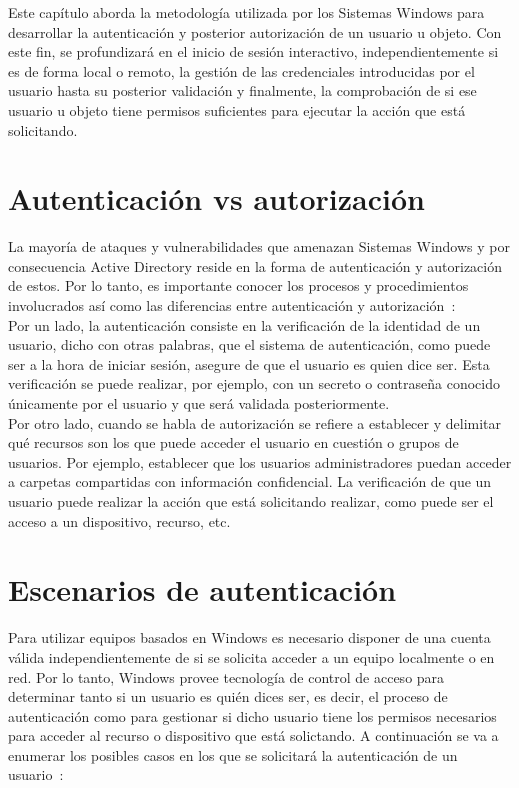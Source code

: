 Este capítulo aborda la metodología utilizada por los Sistemas Windows para desarrollar la autenticación y posterior autorización de un usuario u objeto. Con este fin, se profundizará en el inicio de sesión interactivo, independientemente si es de forma local o remoto, la gestión de las credenciales introducidas por el usuario hasta su posterior validación y finalmente, la comprobación de si ese usuario u objeto tiene permisos suficientes para ejecutar la acción que está solicitando. 

\section{Autenticación vs autorización}

La mayoría de ataques y vulnerabilidades que amenazan Sistemas Windows y por consecuencia Active Directory reside en la forma de autenticación y autorización de estos. Por lo tanto, es importante conocer los procesos y procedimientos involucrados así como las diferencias entre autenticación y autorización~\cite{Capitulo2:AuthenticationConcepts}: \\

Por un lado, la autenticación consiste en la verificación de la identidad de un usuario, dicho con otras palabras, que el sistema de autenticación, como puede ser a la hora de iniciar sesión, asegure de que el usuario es quien dice ser. Esta verificación se puede realizar, por ejemplo, con un secreto o contraseña conocido únicamente por el usuario y que será validada posteriormente. \\

Por otro lado, cuando se habla de autorización se refiere a establecer y delimitar qué recursos son los que puede acceder el usuario en cuestión o grupos de usuarios. Por ejemplo, establecer que los usuarios administradores puedan acceder a carpetas compartidas con información confidencial. La verificación de que un usuario puede realizar la acción que está solicitando realizar, como puede ser el acceso a un dispositivo, recurso, etc. 


\section{Escenarios de autenticación}

Para utilizar equipos basados en Windows es necesario disponer de una cuenta válida independientemente de si se solicita acceder a un equipo localmente o en red. Por lo tanto, Windows provee tecnología de control de acceso para determinar tanto si un usuario es quién dices ser, es decir, el proceso de autenticación como para gestionar  si dicho usuario tiene los permisos necesarios para acceder al recurso o dispositivo que está solictando. A continuación se va a enumerar los posibles casos en los que se solicitará la autenticación de un usuario~\cite{Capitulo2:Scenarios}:

